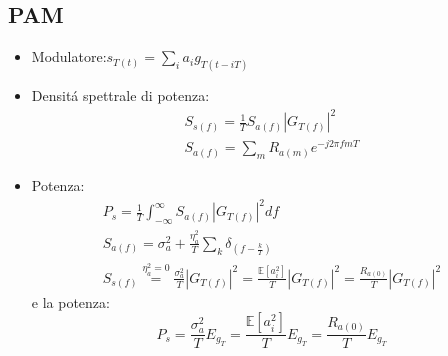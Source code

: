     \subsection{PAM}
        \begin{itemize}
            \item {Modulatore:$s_{T(t)} = \sum_{i}a_ig_{T(t-iT)}$}
            \item {Densitá spettrale di potenza:
                \begin{gather}
                    S_{s(f)} = \frac{1}{T} S_{a(f)}\left|G_{T(f)}\right|^2 \nonumber \\
                    S_{a(f)} = \sum_{m} R_{a(m)}e^{-j2\pi fmT} \nonumber
                \end{gather}  
            }
            \item {Potenza:
                \begin{gather}
                    P_s = \frac{1}{T}\int_{-\infty}^{\infty}S_{a(f)} \left|G_{T(f)}\right|^2 df \nonumber\\
                    S_{a(f)} = \sigma_a^2 + \frac{\eta_a^2 }{T}\sum_{k} \delta_{(f-\frac{k}{T})} \nonumber \\
                    S_{s(f)} \overset{\eta_a^2 = 0}{=} \frac{\sigma_a^2}{T} \left|G_{T(f)}\right|^2 = \frac{\mathbb{E}[a_i^2]}{T} \left|G_{T(f)}\right|^2 = \frac{R_{a(0)}}{T} \left|G_{T(f)}\right|^2 \nonumber
                \end{gather}
                e la potenza:
                \[
                    P_s  = \frac{\sigma_a^2}{T} E_{g_T} = \frac{\mathbb{E}[a_i^2]}{T} E_{g_T} = \frac{R_{a(0)}}{T} E_{g_T}
                \]
            }
            

\end{itemize}
